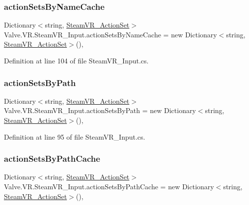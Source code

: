 \subsubsection{\texorpdfstring{actionSetsByNameCache}{actionSetsByNameCache}}
{\footnotesize\ttfamily Dictionary$<$string, \mbox{\hyperlink{class_valve_1_1_v_r_1_1_steam_v_r___action_set}{Steam\+V\+R\+\_\+\+Action\+Set}}$>$ Valve.\+V\+R.\+Steam\+V\+R\+\_\+\+Input.\+action\+Sets\+By\+Name\+Cache = new Dictionary$<$string, \mbox{\hyperlink{class_valve_1_1_v_r_1_1_steam_v_r___action_set}{Steam\+V\+R\+\_\+\+Action\+Set}}$>$()\hspace{0.3cm}{\ttfamily [static]}, {\ttfamily [protected]}}



Definition at line 104 of file Steam\+V\+R\+\_\+\+Input.\+cs.

\mbox{\label{class_valve_1_1_v_r_1_1_steam_v_r___input_acfb4f250bcffea97de00849dc65b00f2}} 
\subsubsection{\texorpdfstring{actionSetsByPath}{actionSetsByPath}}
{\footnotesize\ttfamily Dictionary$<$string, \mbox{\hyperlink{class_valve_1_1_v_r_1_1_steam_v_r___action_set}{Steam\+V\+R\+\_\+\+Action\+Set}}$>$ Valve.\+V\+R.\+Steam\+V\+R\+\_\+\+Input.\+action\+Sets\+By\+Path = new Dictionary$<$string, \mbox{\hyperlink{class_valve_1_1_v_r_1_1_steam_v_r___action_set}{Steam\+V\+R\+\_\+\+Action\+Set}}$>$()\hspace{0.3cm}{\ttfamily [static]}, {\ttfamily [protected]}}



Definition at line 95 of file Steam\+V\+R\+\_\+\+Input.\+cs.

\mbox{\label{class_valve_1_1_v_r_1_1_steam_v_r___input_a319debe0fd717b52106c4006efb69f3d}} 
\subsubsection{\texorpdfstring{actionSetsByPathCache}{actionSetsByPathCache}}
{\footnotesize\ttfamily Dictionary$<$string, \mbox{\hyperlink{class_valve_1_1_v_r_1_1_steam_v_r___action_set}{Steam\+V\+R\+\_\+\+Action\+Set}}$>$ Valve.\+V\+R.\+Steam\+V\+R\+\_\+\+Input.\+action\+Sets\+By\+Path\+Cache = new Dictionary$<$string, \mbox{\hyperlink{class_valve_1_1_v_r_1_1_steam_v_r___action_set}{Steam\+V\+R\+\_\+\+Action\+Set}}$>$()\hspace{0.3cm}{\ttfamily [static]}, {\ttfamily [protected]}}



